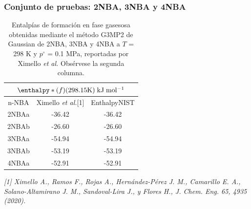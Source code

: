 \documentclass{beamer}
\begin{document}
\begin{frame}
\frametitle{Conjunto de pruebas: 2NBA, 3NBA y 4NBA}
\begin{table}[H]
\centering
\begin{tabular}{|c|c|c|}
\hline
	\multicolumn{3}{||c||}{$\enthalpy*(f){}(298.15 \mathrm{K})\; \mathrm{kJ\;mol^{-1}}$}\\
\hline
\hline
	n-NBA & Ximello \textit{et al.}[1] & EnthalpyNIST\\ 
\hline 
2NBAa & -36.42 & -36.42\\
\hline
2NBAb & -26.60 & -26.60\\ 
\hline 
3NBAa & -54.94 & -54.94\\
\hline
3NBAb & -53.19 & -53.19\\ 
\hline 
4NBAa & -52.91 & -52.91\\ 
\hline  
\end{tabular} 
	\caption{Entalpías de formación en fase gasesosa obtenidas mediante el método G3MP2 de Gaussian de 2NBA, 3NBA y 4NBA a $T$ = 298 K y $p^{\circ}$ = 0.1 MPa, reportadas por Ximello \textit{et al.} Obsérvese la segunda columna.}
\label{Ximello-table-2}
\end{table}
\textit{\tiny{[1] Ximello A., Ramos F., Rojas A., Hernández-Pérez J. M., Camarillo E. A., Solano-Altamirano J. M., Sandoval-Lira J., y Flores H., J. Chem. Eng. 65, 4935 (2020).}}
\end{frame}
\end{document}
